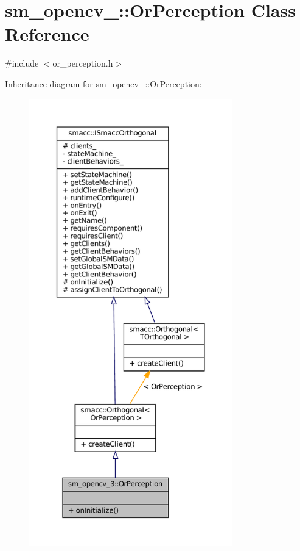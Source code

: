 \hypertarget{classsm__opencv__3_1_1OrPerception}{}\section{sm\+\_\+opencv\+\_\+:\+:Or\+Perception Class Reference}
\label{classsm__opencv__3_1_1OrPerception}


{\ttfamily \#include $<$or\+\_\+perception.\+h$>$}



Inheritance diagram for sm\+\_\+opencv\+\_\+:\+:Or\+Perception\+:
\nopagebreak
\begin{figure}[H]
\begin{center}
\leavevmode
\includegraphics[height=550pt]{classsm__opencv__3_1_1OrPerception__inherit__graph}
\end{center}
\end{figure}


